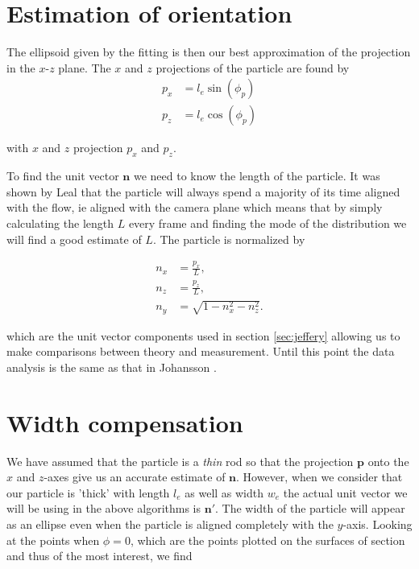 \section{Estimation of orientation}

The ellipsoid given by the fitting is then our best approximation of the projection in the $x$-$z$ plane. The $x$ and $z$ projections of the particle are found by
\begin{align} \label{eq:project}
p_x  &= l_e \sin(\phi_p) \\
p_z  &= l_e \cos(\phi_p) 
\end{align}

with $x$ and $z$ projection $p_x$ and $p_z$. 

To find the unit vector $\mathbf{n}$ we need to know the length of the particle. It was shown by Leal \cite{Leal} that the particle will always spend a majority of its time aligned with the flow, ie aligned with the camera plane which means that by simply calculating the length $L$ every frame and finding the mode of the distribution we will find a good estimate of $L$. The particle is normalized by

\begin{subequations}\label{eq:normalize}
\begin{align}
n_x 	&= \frac{p_x}{L}, \\
n_z 	&= \frac{p_z}{L}, \\
n_y		&= \sqrt{1 - n_x^2 - n_z^2}.
\end{align}
\end{subequations}

which are the unit vector components used in section \ref{sec:jeffery} allowing us to make comparisons between theory and measurement. Until this point the data analysis is the same as that in Johansson \cite{AntonThesis}.

\section{Width compensation}\label{sec:width_compensation}
We have assumed that the particle is a \emph{thin} rod so that the projection $\mathbf{p}$ onto the $x$ and $z$-axes give us an accurate estimate of $\mathbf{n}$. However, when we consider that our particle is 'thick' with length $l_e$ as well as width $w_e$ the actual unit vector we will be using in the above algorithms is $\mathbf{n}'$. The width of the particle will appear as an ellipse even when the particle is aligned completely with the $y$-axis. Looking at the points when $\phi = 0$, which are the points plotted on the surfaces of section and thus of the most 	interest, we find

